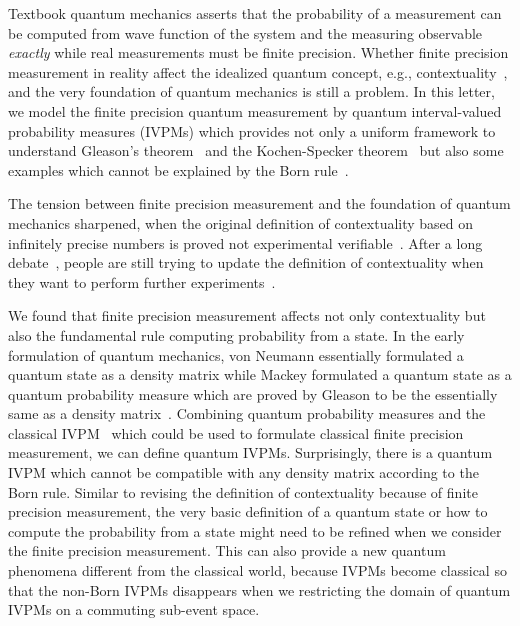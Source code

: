 \documentclass[english,reprint, aps, prl,superscriptaddress, showpacs,
showkeys, longbibliography, amsmath, amssymb]{revtex4-1}
\theoremstyle{plain}
\theoremstyle{definition}
\begin{document}
\maketitle

Textbook quantum mechanics asserts that the probability of a measurement
can be computed from wave function of the system and the measuring
observable \emph{exactly} while real measurements must be finite precision.
Whether finite precision measurement in reality affect the idealized
quantum concept, e.g., contextuality~\cite{PhysRevLett.83.3751,Mermin1999,BarrettKent2004},
and the very foundation of quantum mechanics is still a problem. In
this letter, we model the finite precision quantum measurement by
quantum interval-valued probability measures (IVPMs) which provides
not only a uniform framework to understand Gleason's theorem~\cite{gleason1957,Redhead1987-REDINA,peres1995quantum}
and the Kochen-Specker theorem~\cite{kochenspecker1967,peres1995quantum,Redhead1987-REDINA}
but also some examples which cannot be explained by the Born rule~\cite{Born1983,peres1995quantum,544199,Jaeger2007}.

The tension between finite precision measurement and the foundation
of quantum mechanics sharpened, when the original definition of contextuality
based on infinitely precise numbers is proved not experimental verifiable~\cite{PhysRevLett.83.3751,Kent1999}.
After a long debate~\cite{Mermin1999,Peres2003,BarrettKent2004},
people are still trying to update the definition of contextuality
when they want to perform further experiments~\cite{Spekkens2005,GuehneKleinmannCabelloEtAl2010,MazurekPuseyKunjwalEtAl2016}.

We found that finite precision measurement affects not only contextuality
but also the fundamental rule computing probability from a state.
In the early formulation of quantum mechanics, von Neumann essentially
formulated a quantum state as a density matrix while Mackey formulated
a quantum state as a quantum probability measure which are proved
by Gleason to be the essentially same as a density matrix~\cite{Varadarajan2008}.
Combining quantum probability measures and the classical IVPM~\cite{JamisonLodwick2004}
which could be used to formulate classical finite precision measurement,
we can define quantum IVPMs. Surprisingly, there is a quantum IVPM
which cannot be compatible with any density matrix according to the
Born rule. Similar to revising the definition of contextuality because
of finite precision measurement, the very basic definition of a quantum
state or how to compute the probability from a state might need to
be refined when we consider the finite precision measurement. This
can also provide a new quantum phenomena different from the classical
world, because IVPMs become classical so that the non-Born IVPMs disappears
when we restricting the domain of quantum IVPMs on a commuting sub-event
space. \newpage{}
\end{document}
